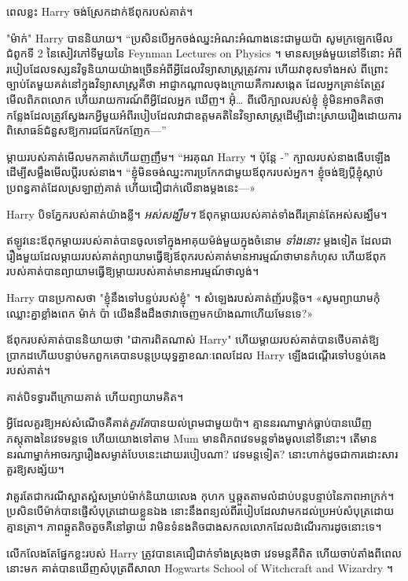 ពេលខ្លះ Harry ចង់ស្រែកដាក់ឪពុករបស់គាត់។

"ម៉ាក់" Harry បាននិយាយ។ “ប្រសិនបើអ្នកចង់ឈ្នះអំណះអំណាងនេះជាមួយប៉ា សូមក្រឡេកមើលជំពូកទី 2 នៃសៀវភៅទីមួយនៃ Feynman Lectures on Physics ។ មានសម្រង់មួយនៅទីនោះ អំពីរបៀបដែលទស្សនវិទូនិយាយយ៉ាងច្រើនអំពីអ្វីដែលវិទ្យាសាស្ត្រត្រូវការ ហើយវាខុសទាំងអស់ ពីព្រោះច្បាប់តែមួយគត់នៅក្នុងវិទ្យាសាស្ត្រគឺថា អាជ្ញាកណ្តាលចុងក្រោយគឺការសង្កេត ដែលអ្នកគ្រាន់តែត្រូវមើលពិភពលោក ហើយរាយការណ៍ពីអ្វីដែលអ្នក ឃើញ។ អ៊ុំ… ពីលើក្បាលរបស់ខ្ញុំ ខ្ញុំមិនអាចគិតថាកន្លែងដែលត្រូវស្វែងរកអ្វីមួយអំពីរបៀបដែលវាជាឧត្តមគតិនៃវិទ្យាសាស្រ្តដើម្បីដោះស្រាយរឿងដោយការពិសោធន៍ជំនួសឱ្យការជជែកវែកញែក—”

ម្តាយរបស់គាត់មើលមកគាត់ហើយញញឹម។ “អរគុណ Harry ។ ប៉ុន្តែ -” ក្បាលរបស់នាងងើបឡើងដើម្បីសម្លឹងមើលប្តីរបស់នាង។ “ខ្ញុំ​មិន​ចង់​ឈ្នះ​ការ​ប្រកែក​ជាមួយ​ឪពុក​របស់​អ្នក​។ ខ្ញុំ​ចង់​ឱ្យ​ប្តី​ខ្ញុំ​ស្តាប់​ប្រពន្ធ​គាត់​ដែល​ស្រឡាញ់​គាត់ ហើយ​ជឿជាក់​លើ​នាង​ម្តង​នេះ​—»

Harry បិទភ្នែករបស់គាត់យ៉ាងខ្លី។ \emph{អស់សង្ឃឹម។} ឪពុកម្តាយរបស់គាត់ទាំងពីរគ្រាន់តែអស់សង្ឃឹម។

ឥឡូវនេះឪពុកម្តាយរបស់គាត់បានចូលទៅក្នុងអាគុយម៉ង់មួយក្នុងចំនោម \emph{ទាំងនោះ} ម្តងទៀត ដែលជារឿងមួយដែលម្តាយរបស់គាត់ព្យាយាមធ្វើឱ្យឪពុករបស់គាត់មានអារម្មណ៍ថាមានកំហុស ហើយឪពុករបស់គាត់បានព្យាយាមធ្វើឱ្យម្តាយរបស់គាត់មានអារម្មណ៍ថាល្ងង់។

Harry បានប្រកាសថា "ខ្ញុំនឹងទៅបន្ទប់របស់ខ្ញុំ" ។ សំឡេងរបស់គាត់ញ័របន្តិច។ «​សូម​ព្យាយាម​កុំ​ឈ្លោះ​គ្នា​ខ្លាំង​ពេក ម៉ាក់ ប៉ា យើង​នឹង​ដឹង​ថា​វា​ចេញ​មក​យ៉ាង​ណា​ហើយ​មែន​ទេ?»

ឪពុករបស់គាត់បាននិយាយថា "ជាការពិតណាស់ Harry" ហើយម្តាយរបស់គាត់បានថើបគាត់ឱ្យប្រាកដហើយបន្ទាប់មកពួកគេបានបន្តប្រយុទ្ធគ្នាខណៈពេលដែល Harry ឡើងជណ្តើរទៅបន្ទប់គេងរបស់គាត់។

គាត់បិទទ្វារពីក្រោយគាត់ ហើយព្យាយាមគិត។

អ្វីដែលគួរឱ្យអស់សំណើចគឺគាត់\emph{គួរតែ}បានយល់ព្រមជាមួយប៉ា។ គ្មាននរណាម្នាក់ធ្លាប់បានឃើញភស្តុតាងនៃវេទមន្តទេ ហើយយោងទៅតាម Mum មានពិភពវេទមន្តទាំងមូលនៅទីនោះ។ តើ​មាន​នរណា​ម្នាក់​អាច​រក្សា​រឿង​សម្ងាត់​បែប​នេះ​ដោយ​របៀប​ណា? វេទមន្តទៀត? នោះ​ហាក់​ដូច​ជា​ការ​ដោះសារ​គួរ​ឱ្យ​សង្ស័យ។

វា​គួរតែ​ជា​ករណី​ស្អាតស្អំ​សម្រាប់​ម៉ាក់​និយាយ​លេង កុហក ឬ​ឆ្កួត​តាម​លំដាប់​បន្តបន្ទាប់​នៃ​ភាព​អាក្រក់។ ប្រសិនបើម៉ាក់បានផ្ញើសំបុត្រដោយខ្លួនឯង នោះនឹងពន្យល់ពីរបៀបដែលវាមកដល់ប្រអប់សំបុត្រដោយគ្មានត្រា។ ភាពឆ្កួតតិចតួចគឺនៅឆ្ងាយ វាមិនទំនងតិចជាងសកលលោកដែលដំណើរការដូចនោះទេ។

លើកលែងតែផ្នែកខ្លះរបស់ Harry ត្រូវបានគេជឿជាក់ទាំងស្រុងថា វេទមន្តគឺពិត ហើយចាប់តាំងពីពេលនោះមក គាត់បានឃើញសំបុត្រពីសាលា Hogwarts School of Witchcraft and Wizardry ។

